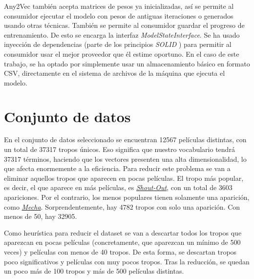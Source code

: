 Any2Vec también acepta matrices de pesos ya inicializadas, así se permite al consumidor ejecutar el modelo con pesos de antiguas iteraciones o generados usando otras técnicas. También se permite
al consumidor guardar el progreso de entrenamiento. De esto se encarga la interfaz \textit{ModelStateInterface}. Se ha usado inyección de dependencias (parte de los principios \textit{SOLID} \cite{martin2000design})
para permitir al consumidor usar el mejor proveedor que él estime oportuno. En el caso de este trabajo, se ha optado por simplemente usar un almacenamiento básico en formato CSV, directamente en el sistema de
archivos de la máquina que ejecuta el modelo.

\section{Conjunto de datos}

En el conjunto de datos seleccionado se encuentran 12567 películas distintas, con un total de 37317 tropos únicos. Eso significa que nuestro vocabulario tendrá 37317 términos, haciendo que
los vectores presenten una alta dimensionalidad, lo que afecta enormemente a la eficiencia. Para reducir este problema se van a eliminar aquellos tropos que aparecen en pocas películas.
El tropo más popular, es decir, el que aparece en más películas, es \href{https://tvtropes.org/pmwiki/pmwiki.php/Main/ShoutOut}{\textit{Shout-Out}}, con un total de 3603 apariciones.
Por el contrario, los menos populares tienen solamente una aparición, como \href{https://tvtropes.org/pmwiki/pmwiki.php/Main/Mecha}{\textit{Mecha}}. Sorprendentemente, hay 4782 tropos con solo una aparición. Con menos
de 50, hay 32905.

Como heurística para reducir el dataset se van a descartar todos los tropos que aparezcan en pocas películas (concretamente, que aparezcan un mínimo de 500 veces) y películas con menos de 40 tropos.
De esta forma, se descartan tropos poco significativos y películas con muy pocos tropos. Tras la reducción, se quedan un poco más de 100 tropos y más de 500 películas distintas.